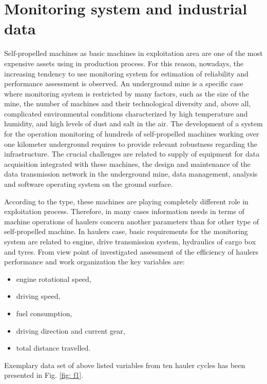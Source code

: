 \section{Monitoring system and industrial data}
Self-propelled machines as basic machines in exploitation area are one of the most expensive assets using in production process. For this reason, nowadays, the increasing tendency to use monitoring system for estimation of reliability and performance assessment is observed. An underground mine is a specific case where monitoring system is restricted by many factors, such as the size of the mine, the number of machines and their technological diversity and, above all, complicated environmental conditions characterized by high temperature and humidity, and high levels of dust and salt in the air. The development of a system for the operation monitoring of hundreds of self-propelled machines working over one kilometer underground requires to provide relevant robustness regarding the infrastructure. The crucial challenges are related to supply of equipment for data acquisition integrated with these machines, the design and maintenance of the data transmission network in the underground mine, data management, analysis and software operating system on the ground surface. \par
According to the type, these machines are playing completely different role in exploitation process. Therefore, in many cases information needs in terms of machine operations of haulers concern another parameters than for other type of self-propelled machine. In haulers case, basic requirements for the monitoring system are related to engine, drive transmission system, hydraulics of cargo box and tyres. From view point of investigated assessment of the efficiency of haulers performance and work organization the key variables are:
\begin{itemize}
\renewcommand{\labelitemi}{$\bullet$}
\item engine rotational speed,
\item driving speed,
\item fuel consumption,
\item driving direction and current gear,
\item total distance travelled.
\end{itemize} \par
Exemplary data set of above listed variables from ten hauler cycles has been presented in Fig. \ref{fig: f1}.\par
